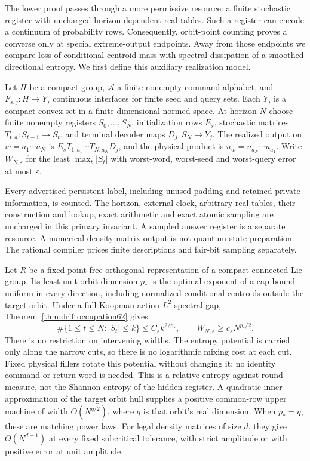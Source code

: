 The lower proof passes through a more permissive resource: a finite
stochastic register with uncharged horizon-dependent real tables.
Such a register can encode a continuum of probability rows.
Consequently, orbit-point counting proves a converse only at special
extreme-output endpoints. Away from those endpoints we compare loss
of conditional-centroid mass with spectral dissipation of a smoothed
directional entropy. We first define this auxiliary realization model.

\begin{definition}\label{def:machine54}
Let $H$ be a compact group, $\mathcal A$ a finite nonempty command
alphabet, and $F_{s,j}:H\to Y_j$ continuous interfaces for finite seed
and query sets. Each $Y_j$ is a compact convex set in a finite-dimensional
normed space. At horizon $N$ choose finite nonempty registers
$S_0,\ldots,S_N$, initialization rows $E_s$, stochastic matrices
$T_{t,a}:S_{t-1}\to S_t$, and terminal decoder maps $D_j:S_N\to Y_j$.
The realized output on $w=a_1\cdots a_N$ is
$E_sT_{1,a_1}\cdots T_{N,a_N}D_j$, and the physical product is
$u_w=u_{a_N}\cdots u_{a_1}$. Write $W_{N,\varepsilon}$ for the least
$\max_t|S_t|$ with worst-word, worst-seed and worst-query error at most
$\varepsilon$.
\end{definition}
Every advertised persistent label, including unused padding and retained
private information, is counted. The horizon, external clock, arbitrary
real tables, their construction and lookup, exact arithmetic and exact
atomic sampling are uncharged in this primary invariant. A sampled
answer register is a separate resource. A numerical density-matrix
output is not quantum-state preparation. The rational compiler prices
finite descriptions and fair-bit sampling separately.

Let $R$ be a fixed-point-free orthogonal representation of a compact
connected Lie group. Its least unit-orbit dimension $p_*$ is the optimal
exponent of a cap bound uniform in every direction, including normalized
conditional centroids outside the target orbit. Under a full Koopman action $L^2$ spectral
gap, Theorem~\ref{thm:driftoccupation62}
gives
\[
 \#\{1\le t\le N:|S_t|\le k\}\le C_\varepsilon k^{2/p_*},
 \qquad W_{N,\varepsilon}\ge c_\varepsilon N^{p_*/2}.
\]
There is no restriction on intervening widths. The entropy potential
is carried only along the narrow cuts, so there is no logarithmic
mixing cost at each cut. Fixed physical fillers rotate this potential
without changing it; no identity command or return word is needed.
This is a relative entropy against round measure, not the Shannon
entropy of the hidden register. A quadratic inner approximation of the target
orbit hull supplies a positive common-row upper machine of width
$O(N^{q/2})$, where $q$ is that orbit's real dimension. When $p_*=q$,
these are matching power laws. For legal density matrices of size $d$,
they give $\Theta(N^{d-1})$ at every fixed subcritical tolerance, with
strict amplitude or with positive error at unit amplitude.

